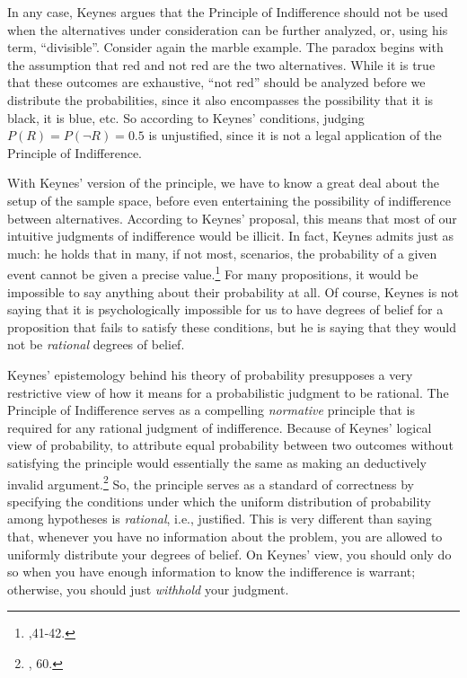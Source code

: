 In any case, Keynes argues that the Principle of
Indifference should not be used when the alternatives under
consideration can be further analyzed, or, using his term,
``divisible''. Consider again the marble example. The paradox begins
with the assumption that red and not red are the two alternatives. While
it is true that these outcomes are exhaustive, ``not red'' should be
analyzed before we distribute the probabilities, since it also
encompasses the possibility that it is black, it is blue, etc. So
according to Keynes' conditions, judging \(P(R) = P(\neg R) = 0.5\) is
unjustified, since it is not a legal application of the Principle of
Indifference.

With Keynes' version of the principle, we have to know a great deal
about the setup of the sample space, before even entertaining the
possibility of indifference between alternatives. According to Keynes'
proposal, this means that most of our intuitive judgments of
indifference would be illicit. In fact, Keynes admits just as much: he
holds that in many, if not most, scenarios, the probability of a given
event cannot be given a precise value.\footnote{\cite{keynes},41-42.} For many propositions, it would
be impossible to say anything about their probability at all. Of course,
Keynes is not saying that it is psychologically impossible for us to
have degrees of belief for a proposition that fails to satisfy these
conditions, but he is saying that they would not be \emph{rational}
degrees of belief.

Keynes' epistemology behind his theory of probability presupposes a very restrictive view of how it means for a probabilistic judgment to be rational.  The Principle of Indifference serves as a compelling \emph{normative} principle that is required for any rational judgment of indifference. Because of Keynes' logical view of probability, to attribute equal probability between two outcomes without satisfying the principle would essentially the same as making an deductively invalid argument.\footnote{\cite{keynes}, 60.}
So, the principle serves as a standard of correctness by specifying the conditions under which the uniform distribution of probability among hypotheses is \emph{rational}, i.e., justified. This is very different than saying that, whenever you have no information about the problem, you are allowed to uniformly distribute your degrees of belief. On Keynes' view, you should only do so when you have enough information to know the indifference is warrant; otherwise, you should just \emph{withhold} your judgment.

